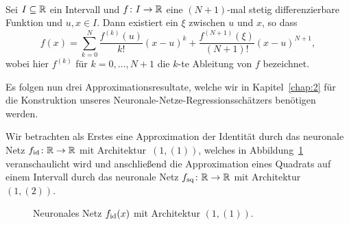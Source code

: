 \begin{lem}
\label{lem:lagrange} \ \\
Sei $I \subseteq \mathbb{R}$ ein Intervall und $f \colon I \to \mathbb{R}$ eine $(N + 1)$-mal stetig differenzierbare Funktion und $u, x \in I$. Dann existiert ein $\xi$ zwischen $u$ und $x$, so dass $$f(x) = \sum_{k = 0}^N \frac{f^{(k)}(u)}{k!}(x - u)^k + \frac{f^{(N + 1)}(\xi)}{(N + 1)!}(x - u)^{N + 1},$$
wobei hier $f^{(k)}$ für $k = 0,\dots,N+1$ die $k$-te Ableitung von $f$ bezeichnet.
\end{lem}
Es folgen nun drei Approximationsresultate, welche wir in Kapitel~\ref{chap:2} für die Konstruktion unseres Neuronale-Netze-Regressionsschätzers benötigen werden.

Wir betrachten als Erstes eine Approximation der Identität durch das neuronale Netz $f_{\mathrm{id}}\colon \mathbb{R} \to \mathbb{R}$ mit Architektur~$(1,(1))$, welches in Abbildung~\ref{fig:fid} veranschaulicht wird und anschließend die Approximation eines Quadrats auf einem Intervall durch das neuronale Netz $f_{\mathrm{sq}}\colon \mathbb{R} \to \mathbb{R}$ mit Architektur~$(1,(2))$.
\begin{figure}[htp]
\centering
{}

\caption{Neuronales Netz $f_{\mathrm{id}}(x)$ mit Architektur $(1,(1))$.}
\label{fig:fid}
\end{figure}
 
